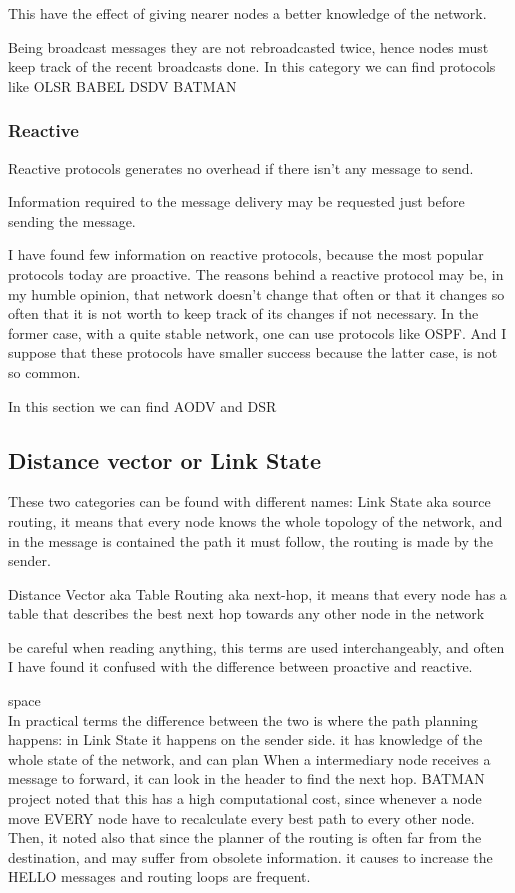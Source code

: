 \documentclass{article}
\begin{document}
This have the effect of giving nearer nodes a better knowledge of the network. 

Being broadcast messages they are not rebroadcasted twice, hence nodes must keep track of the recent broadcasts done. 
In this category we can find protocols like OLSR BABEL DSDV BATMAN



\subsubsection{Reactive}
Reactive protocols generates no overhead if there isn't any message to send.

Information required to the message delivery may be requested just before sending the message.

I have found few information on reactive protocols, because the most popular protocols today are proactive.
The reasons behind a reactive protocol may be, in my humble opinion, that network doesn't change that often or that it changes so often that it is not worth to keep track of its changes if not necessary.
In the former case, with a quite stable network, one can use protocols like OSPF.
And I suppose that these protocols have smaller success because the latter case, is not so common.


In this section we can find AODV and DSR


\subsection{Distance vector or Link State}
These two categories can be found with different names:
Link State aka source routing, it means that every node knows the whole topology of the network, and in the message is contained the path it must follow, the routing is made by the sender.

Distance Vector aka Table Routing aka next-hop, it means that every node has a table that describes the best next hop towards any other node in the network

be careful when reading anything, this terms are used interchangeably, and often I have found it confused with the difference between proactive and reactive.


space\\

In practical terms the difference between the two is where the path planning happens:
in Link State it happens on the sender side. it has knowledge of the whole state of the network, and can plan 
When a intermediary node receives a message to forward, it can look in the header to find the next hop.
BATMAN project noted that this has a high computational cost, since whenever a node move EVERY node have to recalculate every best path to every other node.
Then, it noted also that since the planner of the routing is often far from the destination, and may suffer from obsolete information. it causes to increase the HELLO messages and routing loops are frequent.
\end{document}
